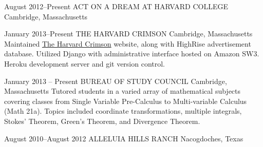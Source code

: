 \documentclass[]{friggeri-cv} %
\begin{document}
\entry
{August 2012--Present}
{ACT ON A DREAM AT HARVARD COLLEGE}
{Cambridge, Massachusetts}
{}
\begin{detailed}
\entry
{January 2013--Present}
{THE HARVARD CRIMSON}
{Cambridge, Massachusetts}
{
{Maintained \href{http://thecrimson.com}{The Harvard Crimson} website, along with HighRise advertisement database. Utilized Django with administrative interface hosted on Amazon SW3. Heroku development server and git version control.}}

\entry
{January 2013 -- Present}
{BUREAU OF STUDY COUNCIL}
{Cambridge, Massachusetts}
{
{Tutored students in a varied array of mathematical subjects covering classes from Single Variable Pre-Calculus to Multi-variable Calculus (Math 21a). Topics included coordinate transformations, multiple integrals, Stokes' Theorem, Green's Theorem, and Divergence Theorem.}}

\entry
{August 2010--August 2012}
{ALLELUIA HILLS RANCH}
{Nacogdoches, Texas}
{}
\end{detailed}
\end{document}
